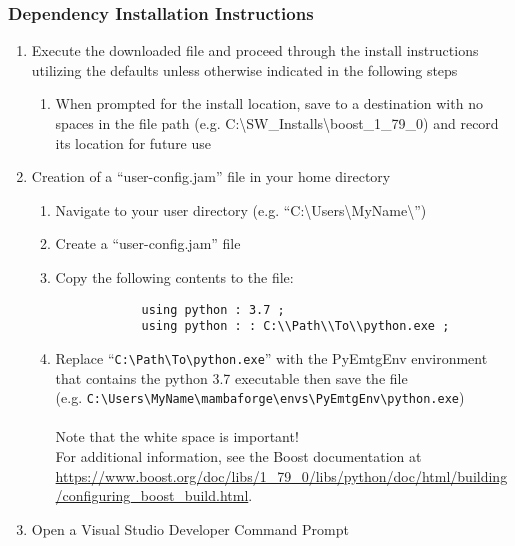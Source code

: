 \subsubsection{Dependency Installation Instructions}
\label{sec:boost_installation_instructions}
\begin{enumerate}
	\item Execute the downloaded file and proceed through the install instructions utilizing the defaults unless otherwise indicated in the following steps 
	\begin{enumerate}
		\item When prompted for the install location, save to a destination with no spaces in the file path (e.g. C:\textbackslash SW\_Installs\textbackslash boost\_1\_79\_0) and record its location for future use
	\end{enumerate}
	\item \label{bundle:boost} Creation of a “user-config.jam” file in your home directory
	\begin{enumerate}
		\item Navigate to your user directory (e.g. “C:\textbackslash Users\textbackslash MyName\textbackslash”)
		\item Create a “user-config.jam” file
		\item Copy the following contents to the file: \\
		\begin{verbatim}
			using python : 3.7 ; 
			using python : : C:\\Path\\To\\python.exe ;
		\end{verbatim}	
		\item 
			Replace ``\texttt{C:\textbackslash Path\textbackslash To\textbackslash python.exe}'' with the PyEmtgEnv environment that 
			contains the python 3.7 executable then save the file \\
			(e.g. \texttt{C:\textbackslash Users\textbackslash MyName\textbackslash mambaforge\textbackslash envs\textbackslash PyEmtgEnv\textbackslash python.exe})
		\\ \\
		Note that the white space is important! \\ For additional information, see the Boost documentation at \url{https://www.boost.org/doc/libs/1_79_0/libs/python/doc/html/building/configuring_boost_build.html}.
	\end{enumerate}	
	\item Open a Visual Studio Developer Command Prompt 

\end{enumerate}

